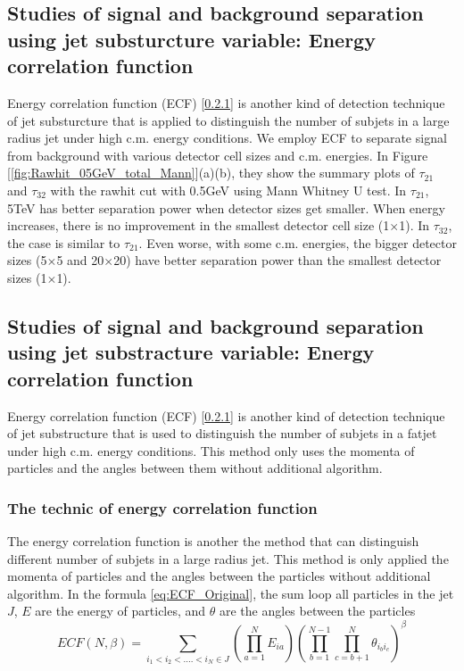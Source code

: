\subsection{Studies of signal and background separation using jet substurcture variable: Energy correlation function}
Energy correlation function (ECF) [\ref{}] is another kind of detection technique of jet substurcture that is applied to distinguish the number of subjets in a large radius jet under high c.m. energy conditions. We employ ECF to separate signal from background with various detector cell sizes and c.m. energies. 
In Figure [\ref{fig:Rawhit_05GeV_total_Mann}](a)(b), they show the summary plots of $\tau_{21}$ and $\tau_{32}$ with the rawhit cut with 0.5GeV using Mann Whitney U test. In $\tau_{21}$, 5TeV has better separation power when detector sizes get smaller. When energy increases, there is no improvement in the smallest detector cell size (1$\times$1). In $\tau_{32}$, the case is similar to  $\tau_{21}$. Even worse, with some c.m. energies, the bigger detector sizes (5$\times$5 and 20$\times$20) have better separation power than the smallest detector sizes (1$\times$1). 
\subsection{Studies of signal and background separation using jet substracture variable: Energy correlation function}
Energy correlation function (ECF) [\ref{}] is another kind of detection technique of jet substructure that is used to distinguish the number of subjets in a fatjet under high c.m. energy conditions. This method only uses the momenta of particles and the angles between them without additional algorithm.\\
\subsubsection{The technic of energy correlation function}
The energy correlation function is another the method that can distinguish different number of subjets in a large radius jet. This method is only applied the momenta of particles and the angles between the particles without additional algorithm. In the formula \ref{eq:ECF_Original}, the sum loop all particles in the jet $J$, $E$ are the energy of particles, and $\theta$ are the angles between the particles\\
\begin{equation} \label{eq:ECF_Original}
ECF(N,\beta)=\sum_{i_{1}<i_{2}<....<i_{N}\in J} (\prod_{a=1}^{N}E_{ia})(\prod_{b=1}^{N-1}\prod_{c=b+1}^{N} \theta_{i_{b}i_{c}})^{\beta}
\end{equation}

